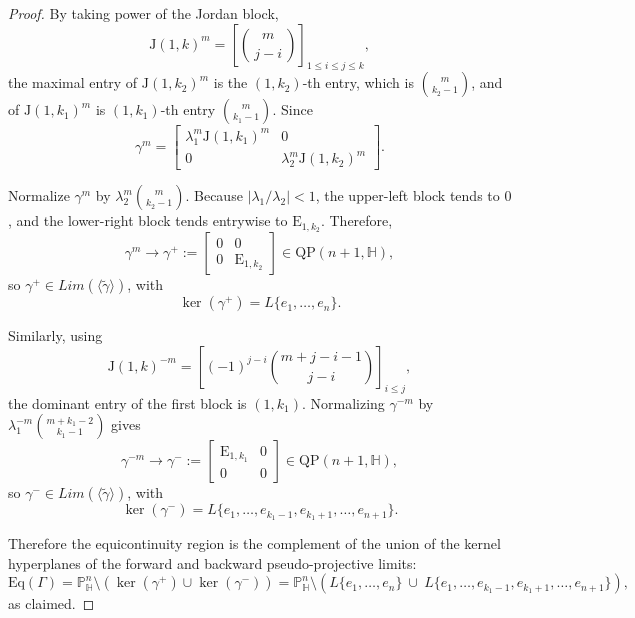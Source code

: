 \documentclass[12pt,reqno]{amsart}
\numberwithin{equation}{section}
\theoremstyle{definition}
\def\H{\mathbb H}
\def\P{\mathbb P}
\def\H{\mathbb {H}}
\begin{document}
\begin{proof}
By taking power of the Jordan block,
$$
\mathrm{J}(1,k)^m=\left[\binom{m}{\,j-i\,}\right]_{1\le i\le j\le k},
$$
the maximal entry of $\mathrm{J}(1,k_2)^m$ is the $(1,k_2)$-th entry, which is $\binom{m}{k_2-1}$, and of $\mathrm{J}(1,k_1)^m$ is $(1,k_1)$-th entry $\binom{m}{k_1-1}$. Since
$$
\gamma^m=
\begin{bmatrix}
\lambda_1^m \mathrm{J}(1,k_1)^m & 0\\[1mm]
0 & \lambda_2^m \mathrm{J}(1,k_2)^m
\end{bmatrix}.
$$

Normalize $\gamma^m$ by $\lambda_2^m \binom{m}{k_2-1}$. Because $|\lambda_1/\lambda_2|<1$, the upper-left block tends to $0$, and the lower-right block tends entrywise to $\mathrm{E}_{1,k_2}$. Therefore,
$$
\gamma^m \longrightarrow
\gamma^+:=
\begin{bmatrix}
0 & 0\\[1mm]
0 & \mathrm{E}_{1,k_2}
\end{bmatrix} \in \mathrm{QP}(n+1,\mathbb{H}),
$$
so $\gamma^+\in Lim(\langle \tilde{\gamma}\rangle)$, with
$$
\ker(\gamma^+)=L\{e_1,\dots,e_n\}.
$$

Similarly, using
$$
\mathrm{J}(1,k)^{-m}=\left[ (-1)^{j-i}\binom{m+j-i-1}{\,j-i\,}\right]_{i\le j},
$$
the dominant entry of the first block is $(1,k_1)$. Normalizing $\gamma^{-m}$ by $\lambda_1^{-m} \binom{m+k_1-2}{k_1-1}$ gives
$$
\gamma^{-m}\longrightarrow
\gamma^-:=
\begin{bmatrix}
\mathrm{E}_{1,k_1} & 0\\[1mm]
0 & 0
\end{bmatrix} \in \mathrm{QP}(n+1,\mathbb{H}),
$$
so $\gamma^-\in Lim(\langle \tilde{\gamma}\rangle)$, with
$$
\ker(\gamma^-)={L}\{e_1,\dots,e_{k_1-1}, e_{k_1+1},\dots,e_{n+1}\}.
$$



Therefore the equicontinuity region is the complement of the union of the kernel hyperplanes of the forward and backward pseudo-projective limits:
$$
\mathrm{Eq}(\Gamma)=\P^n_\H\setminus\left(\ker(\gamma^+)\cup \ker(\gamma^-)\right)
=\P^n_\H\setminus\left({L}\{e_1,\dots,e_n\}\ \cup\ {L}\{e_1,\dots,e_{k_1-1}, e_{k_1+1},\dots,e_{n+1}\}\right),
$$
as claimed.
\end{proof}
\end{document}

